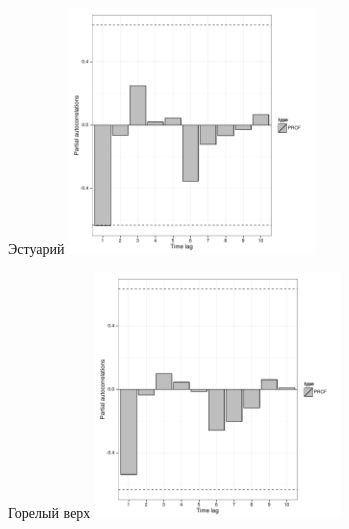 \documentclass[12pt, a4paper]{disser}
\begin{document}
	\begin{figure}[ht]
	
	\begin{minipage}[b]{.46\linewidth}
	\begin{center}
	{\tiny Эстуарий}
		\includegraphics[width=65mm]{../White_Sea/dynamic_N_N1/PRCF_Estuary_.pdf}

	\end{center}
	\end{minipage}
	\hfil %
	\begin{minipage}[b]{.46\linewidth}
	\begin{center}
	{\tiny Горелый верх}
		\includegraphics[width=65mm]{../White_Sea/dynamic_N_N1/PRCF_Goreliy_high_.pdf}
	\end{center}
	\end{minipage}




\end{figure}
\end{document}
